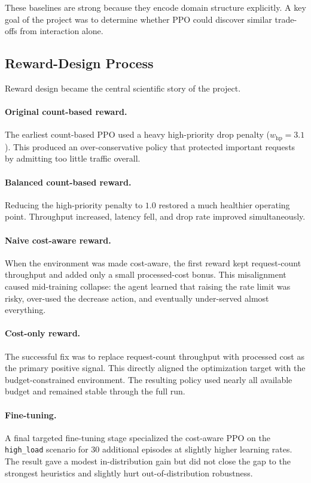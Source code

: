 \documentclass[conference]{IEEEtran}
\begin{document}
These baselines are strong because they encode domain structure explicitly. A key goal of the project was to determine whether PPO could discover similar trade-offs from interaction alone.

\subsection{Reward-Design Process}
Reward design became the central scientific story of the project.

\paragraph{Original count-based reward.}
The earliest count-based PPO used a heavy high-priority drop penalty ($w_{\text{hp}}=3.1$). This produced an over-conservative policy that protected important requests by admitting too little traffic overall.

\paragraph{Balanced count-based reward.}
Reducing the high-priority penalty to $1.0$ restored a much healthier operating point. Throughput increased, latency fell, and drop rate improved simultaneously.

\paragraph{Naive cost-aware reward.}
When the environment was made cost-aware, the first reward kept request-count throughput and added only a small processed-cost bonus. This misalignment caused mid-training collapse: the agent learned that raising the rate limit was risky, over-used the decrease action, and eventually under-served almost everything.

\paragraph{Cost-only reward.}
The successful fix was to replace request-count throughput with processed cost as the primary positive signal. This directly aligned the optimization target with the budget-constrained environment. The resulting policy used nearly all available budget and remained stable through the full run.

\paragraph{Fine-tuning.}
A final targeted fine-tuning stage specialized the cost-aware PPO on the \texttt{high\_load} scenario for $30$ additional episodes at slightly higher learning rates. The result gave a modest in-distribution gain but did not close the gap to the strongest heuristics and slightly hurt out-of-distribution robustness.
\end{document}
